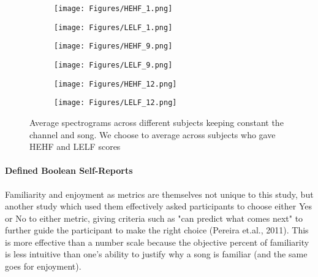 \documentclass[fleqn,10pt]{SelfArx} %
\begin{document}
\begin{figure*}
    \centering
    \begin{subfigure}[b]{0.45\linewidth} %
        \centering
        \texttt{[image: Figures/HEHF\_1.png]}
        \caption{}
        \label{fig:HEHF_1}
    \end{subfigure}%
    \begin{subfigure}[b]{0.45\linewidth} %
        \centering
        \texttt{[image: Figures/LELF\_1.png]} %
        \caption{}
        \label{fig:LELF_1}
    \end{subfigure}
    \begin{subfigure}[b]{0.45\linewidth} %
        \centering
        \texttt{[image: Figures/HEHF\_9.png]} %
        \caption{}
        \label{fig:HEHF_9}
    \end{subfigure}
    \begin{subfigure}[b]{0.45\linewidth} %
        \centering
        \texttt{[image: Figures/LELF\_9.png]} %
        \caption{}
        \label{fig:LELF_9}
    \end{subfigure}
    \begin{subfigure}[b]{0.45\linewidth} %
        \centering
        \texttt{[image: Figures/HEHF\_12.png]} %
        \caption{}
        \label{fig:HEHF_12}
    \end{subfigure}
    \begin{subfigure}[b]{0.45\linewidth} %
        \centering
        \texttt{[image: Figures/LELF\_12.png]} %
        \caption{}
        \label{fig:LELF_12}
    \end{subfigure}
    \caption{Average spectrograms across different subjects keeping constant the channel and song. We choose to average across subjects who gave HEHF and LELF scores}
    \label{fig:avg_spec}
\end{figure*}

\paragraph{Defined Boolean Self-Reports}
Familiarity and enjoyment as metrics are themselves not unique to this study, but another study which used them effectively asked participants to choose either Yes or No to either metric, giving criteria such as "can predict what comes next" to further guide the participant to make the right choice (Pereira et.al., 2011). This is more effective than a number scale because the objective percent of familiarity is less intuitive than one's ability to justify why a song is familiar (and the same goes for enjoyment). 
\end{document}
